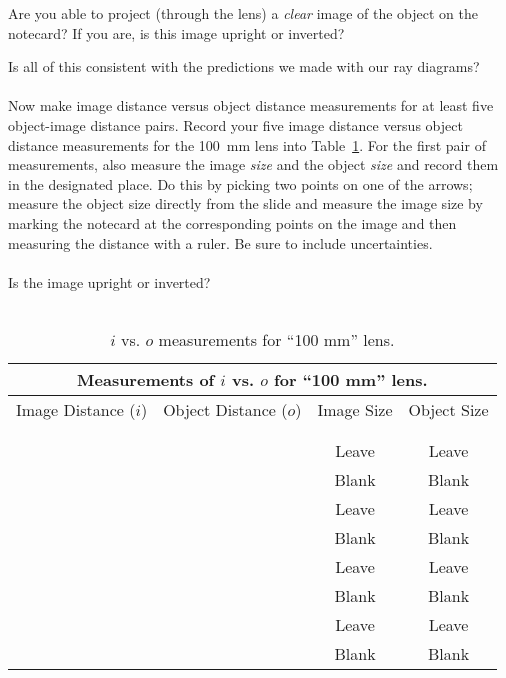 \noindent
Are you able to project (through the lens) a {\it clear} image of the object
on the notecard? If you are, is this image upright or inverted?

\vspace*{1.5cm}
\noindent
Is all of this consistent with the predictions we made with our ray diagrams? \\
\vspace*{2cm} \\
\newpage
Now make image distance versus object distance measurements for at least five
object-image distance pairs. 
Record your five image distance versus object distance measurements for the
100~mm lens into Table~\ref{tab:OP:136}. For the first pair of measurements,
also measure the image {\it size} and the object {\it size} and record them in
the designated place. Do this by picking two points on one of the arrows;
measure the object size directly from the slide and measure the image size by
marking the notecard at the corresponding points on the image and then
measuring the distance with a ruler. Be sure to include uncertainties. \\
\ \\
\noindent Is the image upright or inverted? \\
\ \\
\begin{table}[t]
\begin{center}
\begin{tabular}{|c|c|c|c|}
\hline
\multicolumn{4}{|c|}{Measurements of $i$ vs. $o$ for ``100 mm'' lens.} \\
\hline
Image Distance ($i$) & Object Distance ($o$) & Image Size & Object Size \\
\hline
\hspace*{3cm} & \hspace*{3cm} & \hspace*{3cm} & \hspace*{3cm} \\
& & &  \\
\hline
& & Leave & Leave  \\
& & Blank& Blank \\
\hline
& & Leave & Leave \\
& & Blank & Blank\\
\hline
& & Leave & Leave \\
& & Blank & Blank \\
\hline
& & Leave & Leave \\
& & Blank & Blank \\
\hline
\end{tabular}
\end{center}
\caption{$i$ vs. $o$ measurements for ``100 mm'' lens.}
\label {tab:OP:136}
\end{table}


